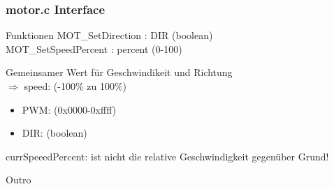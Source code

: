 \documentclass{beamer}
\begin{document}
\begin{frame}
		\frametitle{motor.c Interface}
		
		\begin{block}{Funktionen}
			MOT\_SetDirection : DIR (boolean)\\
			MOT\_SetSpeedPercent : percent (0-100)
		\end{block}

		\begin{block}{}
			Gemeinsamer Wert für Geschwindikeit und Richtung\\ $\Rightarrow$ speed: (-100\% zu 100\%)
			\begin{itemize}
				\item{PWM: (0x0000-0xffff)}
				\item{DIR: (boolean)}
			\end{itemize}
		\end{block}
		\begin{alertblock}{}
			currSpeeedPercent: ist nicht die relative Geschwindigkeit gegenüber Grund!
		\end{alertblock}

\end{frame}
\begin{frame}
	\Huge{\centerline{Outro}}
\end{frame}
\end{document}
